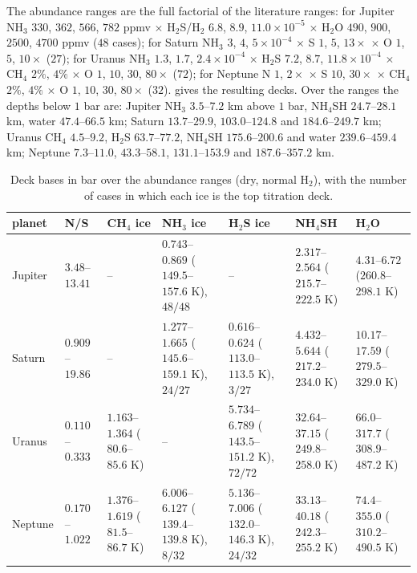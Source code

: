 \documentclass[11pt]{article}
\theoremstyle{definition}\newtheorem{definition}[theorem]{Definition}
\theoremstyle{remark}\newtheorem{remark}[theorem]{Remark}
\begin{document}
The abundance ranges are the full factorial of the literature ranges: for Jupiter NH$_3$ $330$, $362$, $566$, $782$ ppmv $\times$ H$_2$S/H$_2$ $6.8$, $8.9$, $11.0\times10^{-5}$ $\times$ H$_2$O $490$, $900$, $2500$, $4700$ ppmv ($48$ cases); for Saturn NH$_3$ $3$, $4$, $5\times10^{-4}$ $\times$ S $1$, $5$, $13\times$ $\times$ O $1$, $5$, $10\times$ ($27$); for Uranus NH$_3$ $1.3$, $1.7$, $2.4\times10^{-4}$ $\times$ H$_2$S $7.2$, $8.7$, $11.8\times10^{-4}$ $\times$ CH$_4$ $2\%$, $4\%$ $\times$ O $1$, $10$, $30$, $80\times$ ($72$); for Neptune N $1$, $2\times$ $\times$ S $10$, $30\times$ $\times$ CH$_4$ $2\%$, $4\%$ $\times$ O $1$, $10$, $30$, $80\times$ ($32$).  gives the resulting decks. Over the ranges the depths below $1$ bar are: Jupiter NH$_3$ $3.5$--$7.2$ km above $1$ bar, NH$_4$SH $24.7$--$28.1$ km, water $47.4$--$66.5$ km; Saturn $13.7$--$29.9$, $103.0$--$124.8$ and $184.6$--$249.7$ km; Uranus CH$_4$ $4.5$--$9.2$, H$_2$S $63.7$--$77.2$, NH$_4$SH $175.6$--$200.6$ and water $239.6$--$459.4$ km; Neptune $7.3$--$11.0$, $43.3$--$58.1$, $131.1$--$153.9$ and $187.6$--$357.2$ km.

\begin{table}[!htb]\centering\footnotesize\setlength{\tabcolsep}{3pt}
\begin{tabular}{@{}>{\raggedright\arraybackslash}p{1.35cm}>{\raggedright\arraybackslash}p{1.3cm}>{\raggedright\arraybackslash}p{2.0cm}>{\raggedright\arraybackslash}p{2.5cm}>{\raggedright\arraybackslash}p{2.5cm}>{\raggedright\arraybackslash}p{2.3cm}>{\raggedright\arraybackslash}p{2.3cm}@{}}\toprule
planet & N/S & CH$_4$ ice & NH$_3$ ice & H$_2$S ice & NH$_4$SH & H$_2$O\\\midrule
Jupiter & $3.48$--$13.41$ & -- & $0.743$--$0.869$ ($149.5$--$157.6$ K), $48/48$ & -- & $2.317$--$2.564$ ($215.7$--$222.5$ K) & $4.31$--$6.72$ ($260.8$--$298.1$ K)\\
Saturn & $0.909$--$19.86$ & -- & $1.277$--$1.665$ ($145.6$--$159.1$ K), $24/27$ & $0.616$--$0.624$ ($113.0$--$113.5$ K), $3/27$ & $4.432$--$5.644$ ($217.2$--$234.0$ K) & $10.17$--$17.59$ ($279.5$--$329.0$ K)\\
Uranus & $0.110$--$0.333$ & $1.163$--$1.364$ ($80.6$--$85.6$ K) & -- & $5.734$--$6.789$ ($143.5$--$151.2$ K), $72/72$ & $32.64$--$37.15$ ($249.8$--$258.0$ K) & $66.0$--$317.7$ ($308.9$--$487.2$ K)\\
Neptune & $0.170$--$1.022$ & $1.376$--$1.619$ ($81.5$--$86.7$ K) & $6.006$--$6.127$ ($139.4$--$139.8$ K), $8/32$ & $5.136$--$7.006$ ($132.0$--$146.3$ K), $24/32$ & $33.13$--$40.18$ ($242.3$--$255.2$ K) & $74.4$--$355.0$ ($310.2$--$490.5$ K)\\\bottomrule
\end{tabular}
\caption{Deck bases in bar over the abundance ranges (dry, normal H$_2$), with the number of cases in which each ice is the top titration deck.}\label{tab:ranges}
\end{table}
\end{document}
